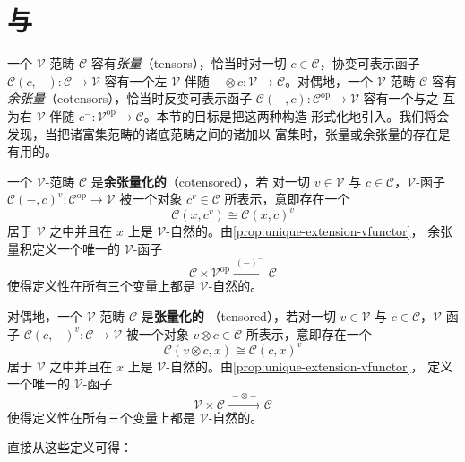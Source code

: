 
\section{\trTensor{}与\trCotensor}\label{sec:tensors-and-cotensors}

一个 $\mathcal{V}$-范畴 $\mathcal{C}$ 容有\emph{张量}（tensors），恰当时对一切
$c\in\mathcal{C}$，协变可表示函子
$\mathcal{C}(c,-)\colon\mathcal{C}\to\mathcal{V}$ 容有一个左 $\mathcal{V}$-伴随
$-\otimes c\colon\mathcal{V}\to\mathcal{C}$。对偶地，一个 $\mathcal{V}$-范畴
$\mathcal{C}$ 容有\emph{余张量}（cotensors），恰当时反变可表示函子
$\mathcal{C}(-,c)\colon\mathcal{C}^{\mathrm{op}}\to\mathcal{V}$ 容有一个与之
互为右 $\mathcal{V}$-伴随
$c^{-}\colon\mathcal{V}^{\mathrm{op}}\to\mathcal{C}$。本节的目标是把这两种构造
形式化地引入。我们将会发现，当把诸富集范畴的诸底范畴之间的诸\trFunctor{}加以
富集时，张量或余张量的存在是有用的。

\begin{definition}\label{def:cotensored}
一个 $\mathcal{V}$-范畴 $\mathcal{C}$ 是\textbf{余张量化的}（cotensored），若
对一切 $v\in\mathcal{V}$ 与 $c\in\mathcal{C}$，$\mathcal{V}$-函子
$\mathcal{C}(-,c)^{v}\colon\mathcal{C}^{\mathrm{op}}\to\mathcal{V}$ 被一个对象
$c^{v}\in\mathcal{C}$ 所表示，意即存在一个\trIsomorphism
\[ \mathcal{C}(x,c^{v})\cong\mathcal{C}(x,c)^{v} \]
居于 $\mathcal{V}$ 之中并且在 $x$ 上是 $\mathcal{V}$-自然的。由\cref{prop:unique-extension-vfunctor}，
余张量积定义一个唯一的 $\mathcal{V}$-函子
\[ \mathcal{C}\times\mathcal{V}^{\mathrm{op}}
   \xrightarrow{\ (-)^{-}\ }\mathcal{C} \]
使得定义性\trIsomorphism{}在所有三个变量上都是 $\mathcal{V}$-自然的。
\end{definition}

\begin{definition}\label{def:tensored}
对偶地，一个 $\mathcal{V}$-范畴 $\mathcal{C}$ 是\textbf{张量化的}
（tensored），若对一切 $v\in\mathcal{V}$ 与 $c\in\mathcal{C}$，$\mathcal{V}$-函子
$\mathcal{C}(c,-)^{v}\colon\mathcal{C}\to\mathcal{V}$ 被一个对象
$v\otimes c\in\mathcal{C}$ 所表示，意即存在一个\trIsomorphism
\[ \mathcal{C}(v\otimes c,x)\cong\mathcal{C}(c,x)^{v} \]
居于 $\mathcal{V}$ 之中并且在 $x$ 上是 $\mathcal{V}$-自然的。由\cref{prop:unique-extension-vfunctor}，
\trTensorProduct{}定义一个唯一的 $\mathcal{V}$-函子
\[ \mathcal{V}\times\mathcal{C}\xrightarrow{\ -\otimes-\ }\mathcal{C} \]
使得定义性\trIsomorphism{}在所有三个变量上都是 $\mathcal{V}$-自然的。
\end{definition}

直接从这些定义可得：

